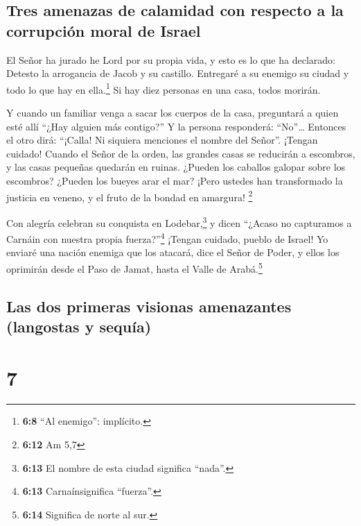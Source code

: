 \hypertarget{tres-amenazas-de-calamidad-con-respecto-a-la-corrupciuxf3n-moral-de-israel}{%
\subsection{Tres amenazas de calamidad con respecto a la corrupción
moral de
Israel}\label{tres-amenazas-de-calamidad-con-respecto-a-la-corrupciuxf3n-moral-de-israel}}

 El Señor ha jurado he Lord por su propia vida, y esto es
lo que ha declarado: Detesto la arrogancia de Jacob y su castillo.
Entregaré a su enemigo su ciudad y todo lo que hay en ella.\footnote{\textbf{6:8}
  ``Al enemigo'': implícito.}  Si hay diez personas en una
casa, todos morirán.

 Y cuando un familiar venga a sacar los cuerpos de la
casa, preguntará a quien esté allí ``¿Hay alguien más contigo?'' Y la
persona responderá: ``No''\ldots{} Entonces el otro dirá: ``¡Calla! Ni
siquiera menciones el nombre del Señor''.  ¡Tengan
cuidado! Cuando el Señor de la orden, las grandes casas se reducirán a
escombros, y las casas pequeñas quedarán en ruinas. 
¿Pueden los caballos galopar sobre los escombros? ¿Pueden los bueyes
arar el mar? ¡Pero ustedes han transformado la justicia en veneno, y el
fruto de la bondad en amargura! \footnote{\textbf{6:12} Am 5,7}

 Con alegría celebran su conquista en Lodebar,\footnote{\textbf{6:13}
  El nombre de esta ciudad significa ``nada''.} y dicen ``¿Acaso no
capturamos a Carnáin con nuestra propia fuerza?''\footnote{\textbf{6:13}
  Carnaínsignifica ``fuerza''.}  ¡Tengan cuidado, pueblo
de Israel! Yo enviaré una nación enemiga que los atacará, dice el Señor
de Poder, y ellos los oprimirán desde el Paso de Jamat, hasta el Valle
de Arabá.\footnote{\textbf{6:14} Significa de norte al sur.}

\hypertarget{las-dos-primeras-visionas-amenazantes-langostas-y-sequuxeda}{%
\subsection{Las dos primeras visionas amenazantes (langostas y
sequía)}\label{las-dos-primeras-visionas-amenazantes-langostas-y-sequuxeda}}

\hypertarget{section-6}{%
\section{7}\label{section-6}}

